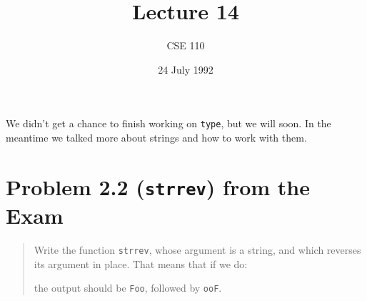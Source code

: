 %
%
%


\def\brac#1{$<$#1$>$}
\def\Int{{\tt int}}
\def\int{\brac{\Int}}
\def\int{\brac{\Int}}
\def\Shortint{{\tt short~int}}
\def\shortint{\brac{\Shortint}}
\def\Longint{{\tt long~int}}
\def\longint{\brac{\Longint}}
\def\Float{{\tt float}}
\def\float{\brac{\Float}}
\def\Double{{\tt double}}
\def\double{\brac{\Double}}
\def\Char{{\tt char}}
\def\chr{\brac{\Char}}
\def\Void{{\tt void}}
\def\void{\brac{\Void}}

\def\ptr#1{pointer~to #1}
\def\p2#1{\brac{\ptr#1}}
\def\Ano#1#2{array~of {#1}~#2s}
\def\ano#1#2{\brac{\Ano#1#2}}
\def\Ao#1{array~of #1}
\def\ao#1{\brac{\Ao#1}}

\def\np{{\tt NULL} pointer}

\def\breakhere{\mbox{$\otimes$}}
\parskip 8pt


\title{Lecture 14}
\author{CSE 110}
\date{24 July 1992}

\pagestyle{fancy}
\rhead{\thepage}
\cfoot{}





\maketitle

We didn't get a chance to finish working on {\tt type}, but we will
soon.  In the meantime we talked more about strings and how to work with
them.

\section{Problem 2.2 ({\tt strrev}) from the Exam}

\begin{quotation}
\small
Write the function {\tt strrev}, whose argument is a string, and which
reverses its argument in place.  That means that if we do:

\noindent the output should be {\tt Foo}, followed by {\tt ooF}.
\end{quotation}


